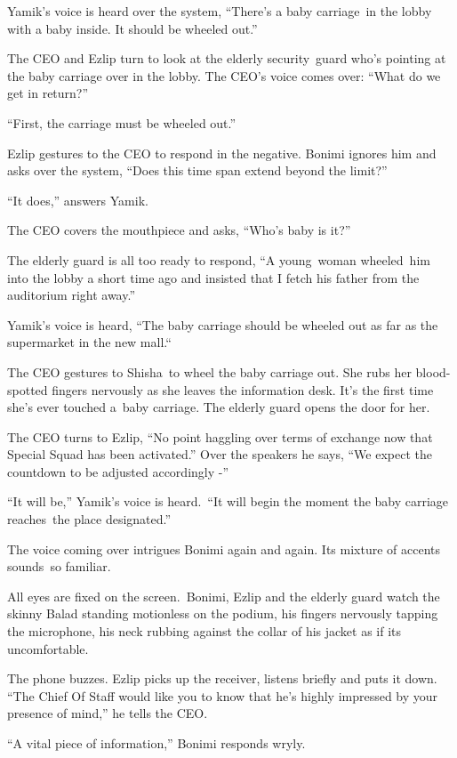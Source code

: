 \documentclass[twoside,11pt]{book}
\begin{document}
Yamik's voice is heard over the system, ``There's a baby carriage\ in the lobby with a baby inside. It
should be wheeled out.''

The CEO and Ezlip turn to look at the elderly security{\ }guard who's pointing
at the baby carriage over in the lobby. The CEO's voice comes over: ``What do we get in
return?'' 

``First, the carriage must be wheeled out.'' 

Ezlip gestures to the CEO to respond in the negative. Bonimi ignores him and asks over the system, ``Does
this time span extend beyond the limit?''

``It does,'' answers Yamik{.}

The CEO covers the mouthpiece and asks, ``Who's baby is it?'' \ 

The elderly guard is all too ready to respond, ``A young{\ }woman
wheeled\ him into the lobby a short time ago and insisted that I fetch his father from the auditorium right
away.'' 

Yamik's voice is heard, ``The baby carriage should be wheeled out as far as the supermarket in the new
mall.``\ 

The CEO gestures to Shisha~to wheel the baby carriage out. She rubs her blood-spotted fingers nervously as she leaves
the information desk. It's the first time she's ever touched a~baby carriage. The elderly guard opens the door for her.

The CEO turns to Ezlip, ``No point haggling over terms of exchange now that Special Squad has been
activated.'' Over the speakers he says, ``We expect the countdown to be adjusted accordingly
-'' 

``It will be,'' Yamik's voice is heard.\ ``It will begin the moment the baby
carriage reaches{\ }the place designated.'' 

The voice coming over intrigues Bonimi again and again. Its mixture of accents sounds\ so familiar.

All eyes are fixed on the screen.{\ }Bonimi, Ezlip and the elderly guard watch
the skinny Balad standing motionless on the podium, his fingers nervously tapping the microphone, his neck rubbing
against the collar of his jacket as if its uncomfortable.

The phone buzzes. Ezlip picks up the receiver, listens briefly and puts it down. ``The Chief Of Staff would
like you to know that he's highly impressed by your presence of mind,'' he tells the CEO.

``A vital piece of information,'' Bonimi responds wryly. 
\end{document}
